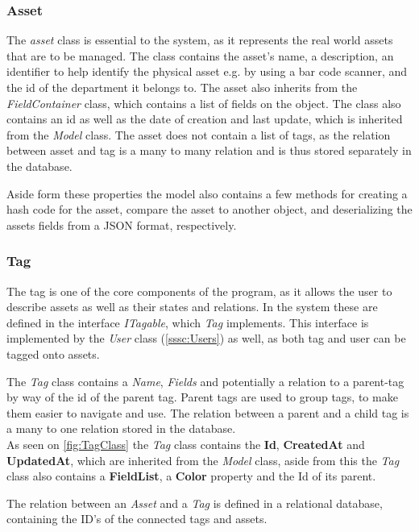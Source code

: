 \subsubsection{Asset}\label{sssc:asset}
The \textit{asset} class is essential to the system, as it represents the real world assets that are to be managed. The class contains the asset's name, a description, an identifier to help identify the physical asset e.g. by using a bar code scanner, and the id of the department it belongs to. The asset also inherits from the \textit{FieldContainer} class, which contains a list of fields on the object. The class also contains an id as well as the date of creation and last update, which is inherited from the \textit{Model} class. The asset does not contain a list of tags, as the relation between asset and tag is a many to many relation and is thus stored separately in the database. 
\par
Aside form these properties the model also contains a few methods for creating a hash code for the asset, compare the asset to another object, and deserializing the assets fields from a JSON format, respectively. 


\subsubsection{Tag}\label{sssc:tag}
The tag is one of the core components of the program, as it allows the user to describe assets as well as their states and relations. In the system these are defined in the interface \textit{ITagable}, which \textit{Tag} implements. This interface is implemented by the \textit{User} class (\autoref{sssc:Users}) as well, as both tag and user can be tagged onto assets. \par
The \textit{Tag} class contains a \textit{Name}, \textit{Fields} and potentially a relation to a parent-tag by way of the id of the parent tag. Parent tags are used to group tags, to make them easier to navigate and use. The relation between a parent and a child tag is a many to one relation stored in the database. \\
As seen on \autoref{fig:TagClass} the \textit{Tag} class contains the \textbf{Id}, \textbf{CreatedAt} and \textbf{UpdatedAt}, which are inherited from the \textit{Model} class, aside from this the \textit{Tag} class also contains a \textbf{FieldList}, a \textbf{Color} property and the Id of its parent. \par {}
The relation between an \textit{Asset} and a \textit{Tag} is defined in a relational database, containing the ID's of the connected tags and assets.

